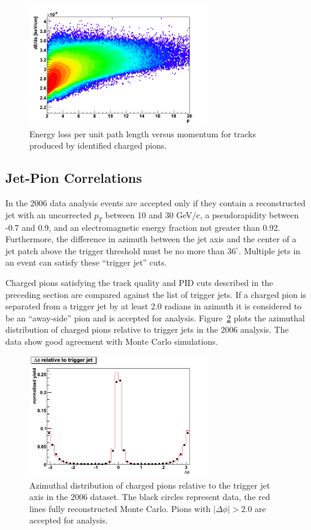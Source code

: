 \begin{figure}
  \centering
  \includegraphics[width=0.7\textwidth]{figures/dEdx_p}
  \caption{Energy loss per unit path length versus momentum for tracks produced by identified charged pions.}
  \label{fig:pid-accept-window}
\end{figure}

\subsection{Jet-Pion Correlations}

In the 2006 data analysis events are accepted only if they contain a
reconstructed jet with an uncorrected \(p_T\) between 10 and 30 GeV/c, a
pseudorapidity between -0.7 and 0.9, and an electromagnetic energy fraction not
greater than 0.92. Furthermore, the difference in azimuth between the jet axis
and the center of a jet patch above the trigger threshold must be no more than
\(36^\circ\). Multiple jets in an event can satisfy these ``trigger jet'' cuts.

Charged pions satisfying the track quality and PID cuts described in the
preceding section are compared against the list of trigger jets. If a charged
pion is separated from a trigger jet by at least 2.0 radians in azimuth it is
considered to be an ``away-side'' pion and is accepted for analysis.
Figure~\ref{fig:dphi} plots the azimuthal distribution of charged pions relative
to trigger jets in the 2006 analysis. The data show good agreement with Monte
Carlo simulations.

\begin{figure}
  \centering
  \includegraphics[width=0.7\textwidth]{figures/dphi}
  \caption{Azimuthal distribution of charged pions relative to the trigger jet axis in the 2006 dataset.  The black circles represent data, the red lines fully reconstructed Monte Carlo. Pions with $|\Delta \phi| > 2.0$ are accepted for analysis.}
  \label{fig:dphi}
\end{figure}

